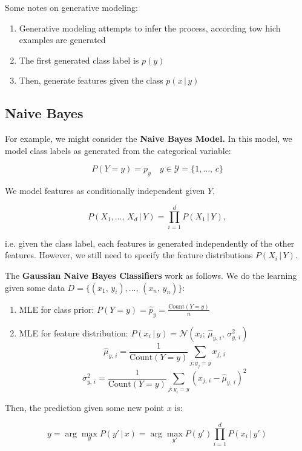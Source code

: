 \documentclass[a4paper]{extarticle}
\begin{document}
Some notes on generative modeling:
\begin{enumerate}
    \item Generative modeling attempts to infer the process, according tow hich examples are generated
    \item The first generated class label is $p(y)$
    \item Then, generate features given the class $p(x \, | \, y)$
\end{enumerate}

\subsection{Naive Bayes}

For example, we might consider the \textbf{Naive Bayes Model.} In this model, we model class labels as generated from the categorical variable:

\[
    P(Y = y) = p_y \quad y \in \mathcal{Y} = \{1,..., \, c\}
\]

We model features as conditionally independent given $Y$,

\[
    P(X_1,..., \, X_d \, | \, Y) = \prod_{i = 1}^d P(X_1 \, | \, Y),
\]

i.e. given the class label, each features is generated independently of the other features. However, we still need to specify the feature distributions $P(X_i \, | \, Y)$.

The \textbf{Gaussian Naive Bayes Classifiers} work as follows. We do the learning given some data $D = \{(x_1, \, y_i),..., \, (x_n, \, y_n)\}$:

\begin{enumerate}
    \item MLE for class prior: $P(Y = y) = \hat{p}_y = \frac{\text{Count}(Y = y)}{n}$
    \item MLE for feature distribution: $P(x_i \, | \, y) = \mathcal{N}(x_i; \, \hat{\mu}_{y, \, i}, \, \sigma^2_{y, \, i})$
    \[
        \hat{\mu}_{y, \, i} = \frac{1}{\text{Count}(Y = y)} \sum_{j;y_j = y}x_{j, \, i}
    \]
    \[
        \sigma^2_{y, \, i} = \frac{1}{\text{Count}(Y = y)} \sum_{j:y_i = y} (x_{j, \, i} - \hat{\mu}_{y, \, i})^2
    \]
\end{enumerate}

Then, the prediction given some new point $x$ is:

\[
    y = \arg \max_y P(y' \, | \, x) = \arg \max_{y'} P(y') \prod_{i = 1}^d P(x_i \, | \, y')
\]
\end{document}
